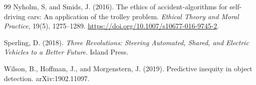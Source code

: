 \documentclass[12pt,a4paper]{article}
\begin{document}
\begin{thebibliography}{99}
Nyholm, S. and Smids, J. (2016).
\newblock The ethics of accident-algorithms for self-driving cars: An application of the trolley problem.
\newblock \emph{Ethical Theory and Moral Practice}, 19(5), 1275--1289. \url{https://doi.org/10.1007/s10677-016-9745-2}.

Sperling, D. (2018).
\newblock \emph{Three Revolutions: Steering Automated, Shared, and Electric Vehicles to a Better Future}.
\newblock Island Press.

Wilson, B., Hoffman, J., and Morgenstern, J. (2019).
\newblock Predictive inequity in object detection.
\newblock arXiv:1902.11097.

\end{thebibliography}
\end{document}
